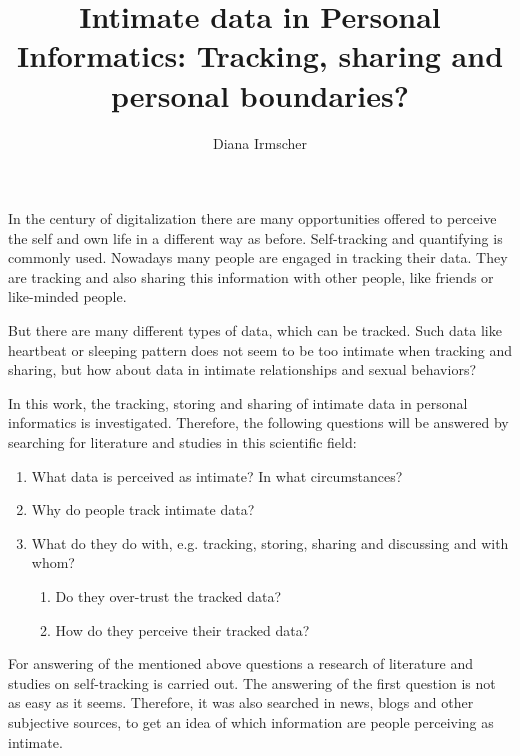\documentclass[journal]{vgtc}                %
\title{Intimate data in Personal Informatics: Tracking, sharing and personal boundaries?}
\author{Diana Irmscher}
\begin{document}

\maketitle

%
%

In the century of digitalization there are many opportunities offered to perceive the self and own life in a different way as before. Self-tracking and quantifying is commonly used. Nowadays many people are engaged in tracking their data. They are tracking and also sharing this information with other people, like friends or like-minded people. 



But there are many different types of data, which can be tracked. Such data like heartbeat or sleeping pattern does not seem to be too intimate when tracking and sharing, but how about data in intimate relationships and sexual behaviors? 


In this work, the tracking, storing and sharing of intimate data in personal informatics is investigated.
Therefore, the following questions will be answered by searching for  literature and studies in this scientific field:
 \begin{enumerate}
 	\item What data is perceived as intimate? In what circumstances?
 	\item Why do people track intimate data?
 	\item What do they do with, e.g. tracking, storing, sharing and discussing and with whom?
 	\begin{enumerate}
 		\item Do they over-trust the tracked data?
 		\item How do they perceive their tracked data?
 	\end{enumerate}
 \end{enumerate}
For answering of the mentioned above questions a research of literature and studies on self-tracking is carried out. The answering of the first question is not as easy as it seems. Therefore, it was also searched in news, blogs and other subjective sources, to get an idea of which information are people perceiving as intimate.
\end{document}
